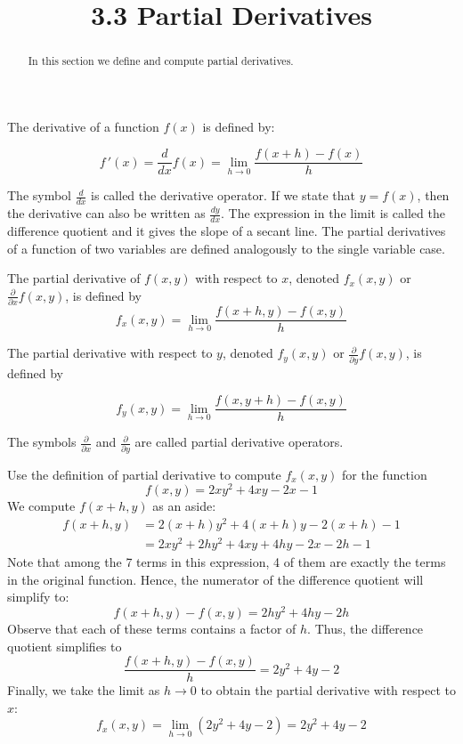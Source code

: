 \documentclass[handout]{ximera}
\title{3.3 Partial Derivatives}
\begin{document}
\begin{abstract}
In this section we define and compute partial derivatives.
\end{abstract}

\maketitle

The derivative of a function $f(x)$ is defined by:

\[
f\,'(x) =  \frac{d}{dx} f(x) = \lim_{h \to 0} \frac{f(x+h) -f(x)}{h}
\]

The symbol $\frac{d}{dx}$ is called the derivative operator. If we state that $y = f(x)$, then the derivative can also be written as $\frac{dy}{dx}$.
The expression in the limit is called the difference quotient and it gives the slope of a secant line.
The partial derivatives of a function of two variables are defined analogously to the single variable case.

\begin{definition}
The partial derivative of $f(x,y)$ with respect to $x$, denoted $f_x(x,y)$ or $\frac{\partial}{\partial x} f(x,y)$, is defined by
\[
f_x(x,y)= \lim_{h \to 0} \frac{f(x+h, y) -f(x, y)}{h}
\]

The partial derivative with respect to $y$, denoted $f_y(x,y)$ or $\frac{\partial}{\partial y} f(x,y)$, is defined by


\[
f_y(x,y) = \lim_{h \to 0} \frac{f(x, y+h) -f(x, y)}{h}
\]

The symbols $\frac{\partial}{\partial x}$ and $\frac{\partial}{\partial y}$ are called partial derivative operators.

\end{definition}



\begin{example}[Example 1]
Use the definition of partial derivative to compute $f_x(x,y)$ for the function
\[
f(x,y) = 2xy^2 + 4xy - 2x -1
\]
We compute $f(x+h, y)$ as an aside:
\begin{align*}
f(x+h, y) &= 2(x+h)y^2 + 4(x+h)y - 2(x+h)  -1\\
          &= 2xy^2 + 2hy^2 + 4xy + 4hy - 2x - 2h - 1
\end{align*}
Note that among the 7 terms in this expression, 4 of them are exactly the terms in the original function.
Hence, the numerator of the difference quotient will simplify to:
\[
f(x+h, y) - f(x,y) =  2hy^2 + 4hy - 2h
\]
Observe that each of these terms contains a factor of $h$. Thus, the difference quotient simplifies to
\[
\frac{f(x+h, y) -f(x, y)}{h} = 2y^2 + 4y - 2
\]
Finally, we take the limit as $h \to 0$ to obtain the partial derivative with respect to $x$:
\[
f_x(x,y) = \lim_{h \to 0} \left(2y^2 + 4y - 2\right) = 2y^2 + 4y - 2
\]

\end{example}
\end{document}
